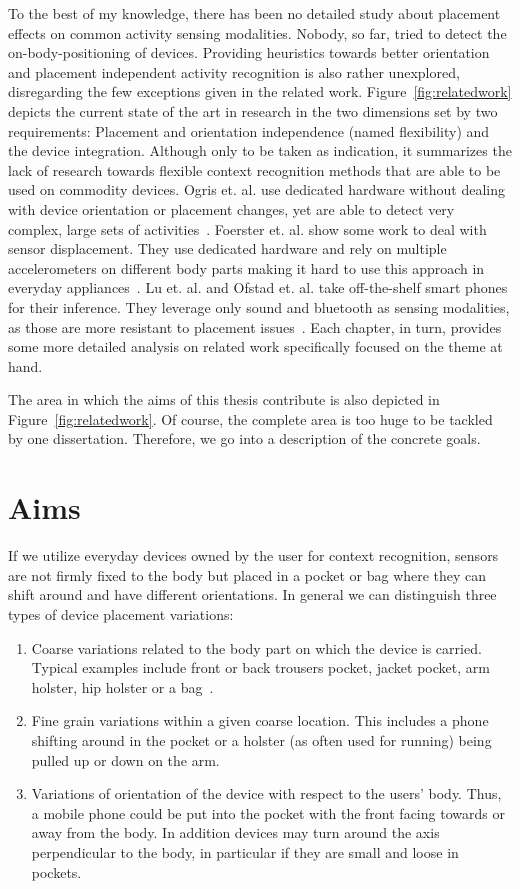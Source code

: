 To the best of my knowledge, there has been no detailed study about
placement effects on common activity sensing modalities. Nobody, so far,
tried to detect the on-body-positioning of devices. Providing heuristics
towards better orientation and placement independent activity
recognition is also rather unexplored, disregarding the few exceptions given in the related work. 
Figure~\ref{fig:relatedwork} depicts the current state of the art in research
in the two dimensions set by two requirements:
Placement and orientation independence (named flexibility) and 
the device integration. Although only to be taken as indication,
it summarizes the lack of research towards flexible context recognition
methods that are able to be used on commodity devices. 
Ogris et. al. use dedicated hardware without dealing with device orientation or placement changes, yet are able to 
detect very complex, large sets of activities~\cite{Ogris:2008p7906}. Foerster et. al. show
some work to deal with sensor displacement. They use dedicated
hardware and rely on multiple accelerometers on different body parts 
making it hard to use this approach in everyday appliances~\cite{Forster1,Forster2}.
Lu et. al. and Ofstad et. al. take off-the-shelf smart phones
for their inference. They leverage only sound and bluetooth as sensing
modalities, as those are more resistant to placement issues~\cite{Ofstad:2008p7556,Chronis:2009p7854}. 
Each chapter, in turn, provides some more detailed analysis on related
work specifically focused on the theme at hand. 


The area in which the aims of this thesis contribute is also depicted
in Figure~\ref{fig:relatedwork}. Of course, the complete area is too huge
to be tackled by one dissertation. Therefore, we go into a description of the concrete goals. 


\section{Aims}
\label{aims}
If we utilize everyday devices owned by the user for context recognition, sensors 
are not firmly fixed to the body but placed in a pocket or bag where they can shift
around and have different orientations. 
In general we can distinguish three types of device placement
variations:
\begin{enumerate}
\item Coarse variations related to the body part on which the device
 is carried. Typical examples include front or back trousers pocket,
 jacket pocket, arm holster, hip holster or a bag~\cite{Ichikawa:2005p6295}. 
\item Fine grain variations within a given coarse location. This
 includes a phone shifting around in the pocket or a holster (as
 often used for running)
 being pulled up or down on the arm.
\item Variations of orientation of the device with respect to the
 users' body. Thus, a mobile phone could be put into the pocket with
 the front facing towards or away from the body. In addition 
 devices may turn around the axis perpendicular to the body, in particular
 if they are small and loose in pockets.
\end{enumerate} 

